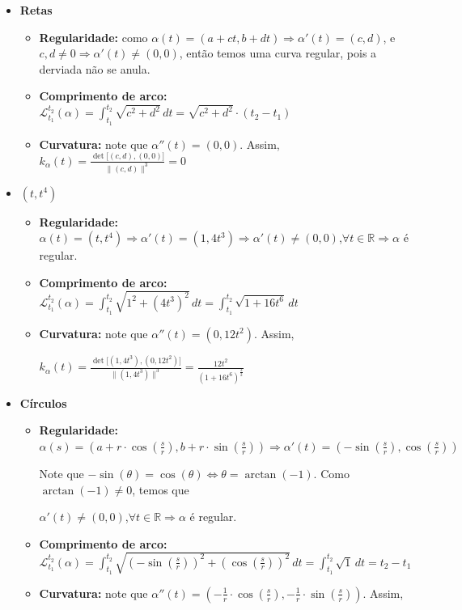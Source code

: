\documentclass[../main.tex]{subfiles}
\begin{document}
\begin{solucao}
	\begin{itemize}
		\item \textbf{Retas}
		\begin{itemize}
			\item \textbf{Regularidade:} como $\alpha(t)=(a+ct,b+dt)\Rightarrow \alpha'(t)=(c,d)$, e $c,d\neq 0\Rightarrow \alpha'(t)\neq (0,0)$, então temos uma curva regular, pois a derviada não se anula.
			\item \textbf{Comprimento de arco:}  $\mathcal{L}_{t_1}^{t_2}(\alpha)=\int_{t_1}^{t_2} \sqrt{c^2+d^2}\, dt=\sqrt{c^2+d^2}\cdot (t_2-t_1)$
			\item \textbf{Curvatura:} note que $\alpha''(t)=(0,0)$. Assim, $k_\alpha(t)=\frac{\det\big[(c,d), (0,0)\big]}{\|(c,d)\|^3}=0$
		\end{itemize}
		\item \textbf{$(t,t^4)$}
		\begin{itemize}
			\item \textbf{Regularidade:} $\alpha(t)=(t,t^4)\Rightarrow \alpha'(t)=(1,4t^3)\Rightarrow \alpha'(t)\neq(0,0)$,$\forall t\in \mathbb{R}\Rightarrow \alpha$ é regular.
			\item \textbf{Comprimento de arco:}  $\mathcal{L}_{t_1}^{t_2}(\alpha)=\int_{t_1}^{t_2} \sqrt{1^2+(4t^3)^2}\, dt=\int_{t_1}^{t_2} \sqrt{1+16t^6}\, dt$
			\item \textbf{Curvatura:} note que $\alpha''(t)=(0,12t^2)$. Assim,
			
			$k_\alpha(t)=\frac{\det\big[(1,4t^3), (0,12t^2)\big]}{\|(1,4t^3)\|^3}=\frac{12t^2}{(1+16t^6)^{\frac{3}{2}}}$
		\end{itemize}
		\item \textbf{Círculos}
		\begin{itemize}
			\item \textbf{Regularidade:} $\alpha(s)=(a+r\cdot \cos(\frac{s}{r}),b+r\cdot \sin(\frac{s}{r}))\Rightarrow \alpha'(t)=(-\sin(\frac{s}{r}),\cos(\frac{s}{r}))$ 
			
			Note que $-\sin(\theta)=\cos(\theta)\Leftrightarrow\theta=\arctan(-1)$. Como $\arctan(-1)\neq 0$, temos que
			
			$\alpha'(t)\neq(0,0)$,$\forall t\in \mathbb{R}\Rightarrow \alpha$ é regular.
			\item \textbf{Comprimento de arco:}  $\mathcal{L}_{t_1}^{t_2}(\alpha)=\int_{t_1}^{t_2} \sqrt{(-\sin(\frac{s}{r}))^2+(\cos(\frac{s}{r}))^2}\, dt=\int_{t_1}^{t_2} \sqrt{1}\, dt=t_2-t_1$
			\item \textbf{Curvatura:} note que $\alpha''(t)=(-\frac{1}{r}\cdot \cos(\frac{s}{r}),-\frac{1}{r}\cdot \sin(\frac{s}{r}))$. Assim,
			

\end{itemize}
\end{itemize}
\end{solucao}
\end{document}
